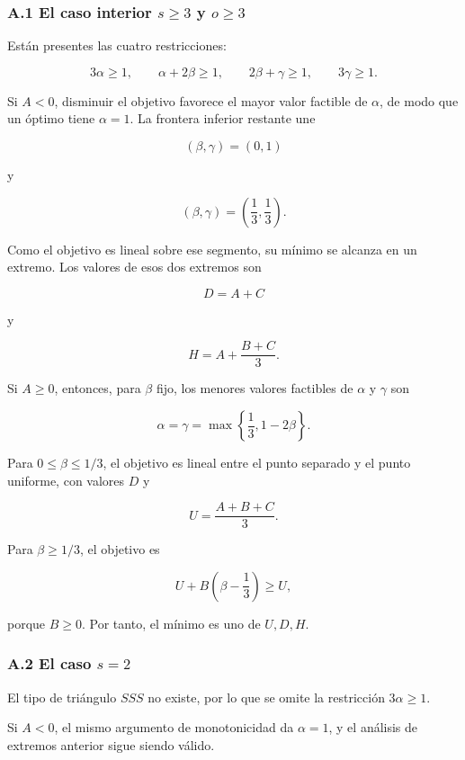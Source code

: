 \documentclass[spanish,11pt,a4paper]{article}
\begin{document}
\subsubsection{\texorpdfstring{A.1 El caso interior \(s\ge3\) y
\(o\ge3\)}{A.1 El caso interior s\textbackslash ge3 y o\textbackslash ge3}}\label{a.1-el-caso-interior-sge3-y-oge3}

Están presentes las cuatro restricciones:

\[
3\alpha\ge1,
\qquad
\alpha+2\beta\ge1,
\qquad
2\beta+\gamma\ge1,
\qquad
3\gamma\ge1.
\]

Si \(A<0\), disminuir el objetivo favorece el mayor valor factible de
\(\alpha\), de modo que un óptimo tiene \(\alpha=1\). La frontera
inferior restante une

\[
(\beta,\gamma)=(0,1)
\]

y

\[
(\beta,\gamma)=\left(\frac13,\frac13\right).
\]

Como el objetivo es lineal sobre ese segmento, su mínimo se alcanza en
un extremo. Los valores de esos dos extremos son

\[
D=A+C
\]

y

\[
H=A+\frac{B+C}{3}.
\]

Si \(A\ge0\), entonces, para \(\beta\) fijo, los menores valores
factibles de \(\alpha\) y \(\gamma\) son

\[
\alpha=\gamma=\max\left\{\frac13,1-2\beta\right\}.
\]

Para \(0\le\beta\le1/3\), el objetivo es lineal entre el punto separado
y el punto uniforme, con valores \(D\) y

\[
U=\frac{A+B+C}{3}.
\]

Para \(\beta\ge1/3\), el objetivo es

\[
U+B\left(\beta-\frac13\right)\ge U,
\]

porque \(B\ge0\). Por tanto, el mínimo es uno de \(U,D,H\).

\subsubsection{\texorpdfstring{A.2 El caso
\(s=2\)}{A.2 El caso s=2}}\label{a.2-el-caso-s2}

El tipo de triángulo \(SSS\) no existe, por lo que se omite la
restricción \(3\alpha\ge1\).

Si \(A<0\), el mismo argumento de monotonicidad da \(\alpha=1\), y el
análisis de extremos anterior sigue siendo válido.
\end{document}
